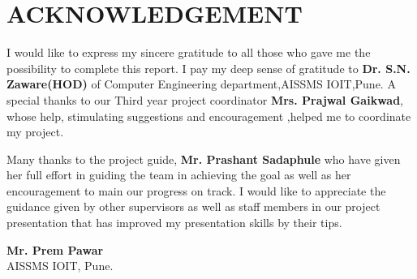 \documentclass[12pt]{report}	%
\begin{document}
\chapter*{ACKNOWLEDGEMENT}
I would like to express my sincere gratitude to all those who gave me the possibility to complete this report. I pay my deep sense of gratitude to \textbf{Dr. S.N. Zaware(HOD)} of Computer Engineering department,AISSMS IOIT,Pune. A special thanks to our Third year project coordinator \textbf{Mrs. Prajwal Gaikwad}, whose help, stimulating suggestions and encouragement ,helped me to coordinate my project.

Many thanks to the project guide, \textbf{Mr. Prashant Sadaphule} who have given her full effort in guiding the team in achieving the goal as well as her encouragement to main our progress on track. I would like to appreciate the guidance given by other supervisors as well as staff members in our project presentation that has improved my presentation skills by their tips.


\vspace{20mm} 
\begin{flushright}
{
\begin{minipage}{2.7 in}
\textbf{Mr. Prem Pawar }\\
 AISSMS IOIT, Pune.\\
\end{minipage}} \hfill
\end{flushright}
\newpage


\tableofcontents
\newpage
\newpage
{}
\listoffigures
\newpage
{}
\listoftables
\newpage	








\end{document}
